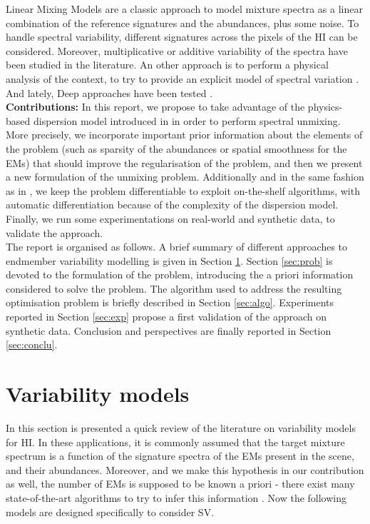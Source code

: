 \documentclass{article}
\begin{document}
Linear Mixing Models \citep{LMM} are a classic approach to model mixture spectra as a linear combination of the reference signatures and the abundances, plus some noise. To handle spectral variability, different signatures across the pixels of the HI can be considered. Moreover, multiplicative \citep{veganzones2014} or additive \citep{johnson2013} variability of the spectra have been studied in the literature. An other approach is to perform a physical analysis of the context, to try to provide an explicit model of spectral variation \citep{janiczek_differentiable_2020,griffin2003}. And lately, Deep approaches have been tested \citep{borsoi_deep_2019}.\\

\textbf{Contributions:}
In this report, we propose to take advantage of the physics-based dispersion model introduced in \citet{janiczek_differentiable_2020} in order to perform spectral unmixing. More precisely, we incorporate important prior information about the elements of the problem (such as sparsity of the abundances or spatial smoothness for the EMs) that should improve the regularisation of the problem, and then we present a new formulation of the unmixing problem. Additionally and in the same fashion as in \citet{janiczek_differentiable_2020}, we keep the problem differentiable to exploit on-the-shelf algorithms, with automatic differentiation because of the complexity of the dispersion model. Finally, we run some experimentations on real-world and synthetic data, to validate the approach.\\

The report is organised as follows. A brief summary of different approaches to endmember variability modelling is given in Section \ref{sec:variab}. Section \ref{sec:prob} is devoted to the formulation of the problem, introducing the a priori information considered to solve the problem. The algorithm used to address the resulting optimisation problem is briefly described in Section \ref{sec:algo}. Experiments reported in Section \ref{sec:exp} propose a first validation of the approach on synthetic data. Conclusion and perspectives are finally reported in Section \ref{sec:conclu}.

\section{Variability models}\label{sec:variab}
In this section is presented a quick review of the literature on variability models for HI. In these applications, it is commonly assumed that the target mixture spectrum is a function of the signature spectra of the EMs present in the scene, and their abundances. Moreover, and we make this hypothesis in our contribution as well, the number of EMs is supposed to be known a priori - there exist many state-of-the-art algorithms to try to infer this information \citep{bioucas2008}. Now the following models are designed specifically to consider SV.
\end{document}
